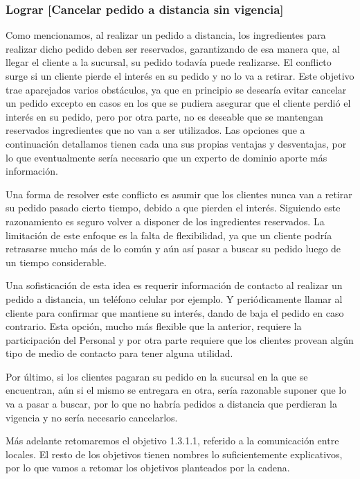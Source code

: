 \documentclass[a4paper,10pt]{article}
\begin{document}
\subsubsection*{Lograr [Cancelar pedido a distancia sin vigencia]}
Como mencionamos, al realizar un pedido a distancia, los ingredientes para realizar dicho pedido deben ser reservados, garantizando de esa manera que, al llegar el cliente a la sucursal, su pedido todavía puede realizarse. El conflicto surge si un cliente pierde el interés en su pedido y no lo va a retirar.
Este objetivo trae aparejados varios obstáculos, ya que en principio se desearía evitar cancelar un pedido excepto en casos en los que se pudiera asegurar que el cliente perdió el interés en su pedido, pero por otra parte, no es deseable que se mantengan reservados ingredientes que no van a ser utilizados.
Las opciones que a continuación detallamos tienen cada una sus propias ventajas y desventajas, por lo que eventualmente sería necesario que un experto de dominio aporte más información.


Una forma de resolver este conflicto es asumir que los clientes nunca van a retirar su pedido pasado cierto tiempo, debido a que pierden el interés. Siguiendo este razonamiento es seguro volver a disponer de los ingredientes reservados. La limitación de este enfoque es la falta de flexibilidad, ya que un cliente podría retrasarse mucho más de lo común y aún así pasar a buscar su pedido luego de un tiempo considerable.

Una sofisticación de esta idea es requerir información de contacto al realizar un pedido a distancia, un teléfono celular por ejemplo. Y periódicamente llamar al cliente para confirmar que mantiene su interés, dando de baja el pedido en caso contrario. Esta opción, mucho más flexible que la anterior, requiere la participación del Personal y por otra parte requiere que los clientes provean algún tipo de medio de contacto para tener alguna utilidad.

Por último, si los clientes pagaran su pedido en la sucursal en la que se encuentran, aún si el mismo se entregara en otra, sería razonable suponer que lo va a pasar a buscar, por lo que no habría pedidos a distancia que perdieran la vigencia y no sería necesario cancelarlos.

Más adelante retomaremos el objetivo 1.3.1.1, referido a la comunicación entre locales.
El resto de los objetivos tienen nombres lo suficientemente explicativos, por lo que vamos a retomar los objetivos planteados por la cadena.
\end{document}
